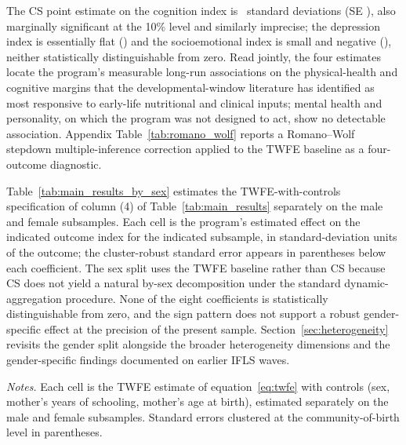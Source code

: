 The CS point estimate on the cognition index is \CoefCogCS\ standard deviations (SE \SECogCS), also marginally significant at the 10\% level and similarly imprecise; the depression index is essentially flat (\CoefDepCS) and the socioemotional index is small and negative (\CoefSocCS), neither statistically distinguishable from zero. Read jointly, the four estimates locate the program's measurable long-run associations on the physical-health and cognitive margins that the developmental-window literature has identified as most responsive to early-life nutritional and clinical inputs; mental health and personality, on which the program was not designed to act, show no detectable association. Appendix Table~\ref{tab:romano_wolf} reports a Romano--Wolf stepdown multiple-inference correction applied to the TWFE baseline as a four-outcome diagnostic.

Table~\ref{tab:main_results_by_sex} estimates the TWFE-with-controls specification of column (4) of Table~\ref{tab:main_results} separately on the male and female subsamples. Each cell is the program's estimated effect on the indicated outcome index for the indicated subsample, in standard-deviation units of the outcome; the cluster-robust standard error appears in parentheses below each coefficient. The sex split uses the TWFE baseline rather than CS because CS does not yield a natural by-sex decomposition under the standard dynamic-aggregation procedure. None of the eight coefficients is statistically distinguishable from zero, and the sign pattern does not support a robust gender-specific effect at the precision of the present sample. Section~\ref{sec:heterogeneity} revisits the gender split alongside the broader heterogeneity dimensions and the gender-specific findings \textcite{frankenberg2005} documented on earlier IFLS waves.

\begin{table}[!htbp] \centering \caption{Heterogeneity by sex: TWFE estimates with controls.} \label{tab:main_results_by_sex}  \begin{minipage}{0.85\textwidth} \footnotesize \emph{Notes.} Each cell is the TWFE estimate of equation~\eqref{eq:twfe} with controls (sex, mother's years of schooling, mother's age at birth), estimated separately on the male and female subsamples. Standard errors clustered at the community-of-birth level in parentheses. \end{minipage} \end{table}

